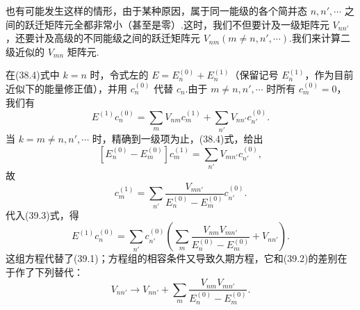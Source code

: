 也有可能发生这样的情形，由于某种原因，属于同一能级的各个简并态 $n,n',\cdots$ 之间的跃迁矩阵元全都非常小（甚至是零）.这时，我们不但要计及一级矩阵元 $V_{nn'}$，还要计及高级的不同能级之间的跃迁矩阵元 $V_{nm}\left(m\neq n,n',\cdots\right)$.我们来计算二级近似的 $V_{mn}$ 矩阵元.

在(38.4)式中 $k=n$ 时，令式左的 $E=E_n^{(0)}+E_n^{(1)}$（保留记号 $E_n^{(1)}$，作为目前近似下的能量修正值），并用 $c_n^{(0)}$ 代替 $c_n$.由于 $m\neq n,n',\cdots$ 时所有 $c_m^{(0)}=0$，我们有
\begin{equation}
  E^{(1)}c_n^{(0)}=\sum_m V_{nm}c_m^{(1)}+\sum_{n'}V_{nn'}c_{n'}^{(0)}.
\end{equation}
当 $k=m\neq n,n',\cdots$ 时，精确到一级项为止，(38.4)式，给出
\begin{equation*}
  \left[E_n^{(0)}-E_m^{(0)}\right]c_m^{(1)}=\sum_{n'}V_{mn'}c_{n'}^{(0)},
\end{equation*}
故
\begin{equation*}
  c_m^{(1)}=\sum_{n'}\frac{V_{mn'}}{E_n^{(0)}-E_m^{(0)}}c_{n'}^{(0)}.
\end{equation*}
代入(39.3)式，得
\begin{equation*}
  E^{(1)}c_n^{(0)}=\sum_{n'}c_{n'}^{(0)}
  \left(\sum_m\frac{V_{nm}V_{mn'}}{E_n^{(0)}-E_m^{(0)}}+V_{nn'}\right).
\end{equation*}
这组方程代替了(39.1)；方程组的相容条件又导致久期方程，它和(39.2)的差别在于作了下列替代：
\begin{equation}
  V_{nn'}\longrightarrow V_{nn'}+\sum_m\frac{V_{nm}V_{mn'}}{E_n^{(0)}-E_m^{(0)}}.
\end{equation}


